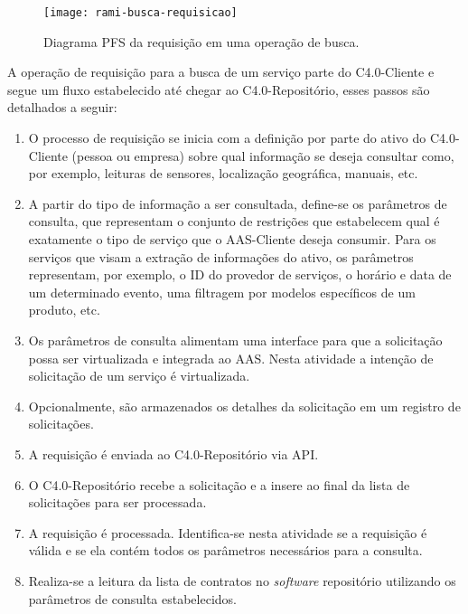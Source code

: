 \begin{figure}[htb]
	\centering
	\texttt{[image: rami-busca-requisicao]}
	\caption{Diagrama PFS da requisição em uma operação de busca.}
	\label{fig:rami-busca-requisicao}
\end{figure}

A operação de requisição para a busca de um serviço parte do C4.0-Cliente e segue um fluxo estabelecido até chegar ao C4.0-Repositório, esses passos são detalhados a seguir:

\begin{enumerate}

	\item O processo de requisição se inicia com a definição por parte do ativo do C4.0-Cliente (pessoa ou empresa) sobre qual informação se deseja consultar como, por exemplo, leituras de sensores, localização geográfica, manuais, etc.

	\item A partir do tipo de informação a ser consultada, define-se os parâmetros de consulta, que representam o conjunto de restrições que estabelecem qual é exatamente o tipo de serviço que o AAS-Cliente deseja consumir. Para os serviços que visam a extração de informações do ativo, os parâmetros representam, por exemplo, o ID do provedor de serviços, o horário e data de um determinado evento, uma filtragem por modelos específicos de um produto, etc.

	\item Os parâmetros de consulta alimentam uma interface para que a solicitação possa ser virtualizada e integrada ao AAS. Nesta atividade a intenção de solicitação de um serviço é virtualizada.

	\item Opcionalmente, são armazenados os detalhes da solicitação em um registro de solicitações.

	\item A requisição é enviada ao C4.0-Repositório via API.

	\item O C4.0-Repositório recebe a solicitação e a insere ao final da lista de solicitações para ser processada.

	\item A requisição é processada. Identifica-se nesta atividade se a requisição é válida e se ela contém todos os parâmetros necessários para a consulta.

	\item Realiza-se a leitura da lista de contratos no \textit{software} repositório utilizando os parâmetros de consulta estabelecidos.

\end{enumerate}

